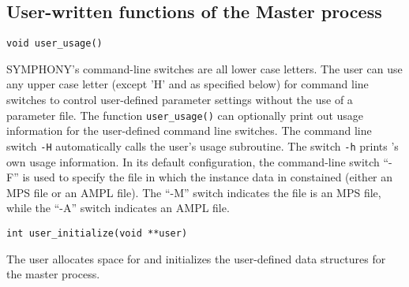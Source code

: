 
\subsection{User-written functions of the Master process}

\bd


\label{user_usage}
\begin{verbatim}
void user_usage()
\end{verbatim}

\bd

\describe

SYMPHONY's command-line switches are all lower case letters. The user can use
any upper case letter (except 'H' and as specified below) for command line
switches to control user-defined parameter settings without the use of a
parameter file. The function {\tt user\_usage()} can optionally print out
usage information for the user-defined command line switches. The command line
switch {\tt -H} automatically calls the user's usage subroutine. The switch
{\tt -h} prints \BB's own usage information. In its default configuration, the
command-line switch ``-F'' is used to specify the file in which the instance
data in constained (either an MPS file or an AMPL file). The ``-M'' switch
indicates the file is an MPS file, while the ``-A'' switch indicates an AMPL
file. 

\ed

\vspace{1ex}

\begin{verbatim}
int user_initialize(void **user)
\end{verbatim}

\bd

\describe

The user allocates space for and initializes the user-defined
data structures for the master process.

\args

